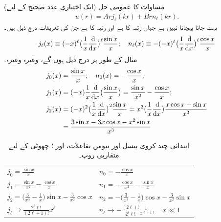 (ایک اختیاری عدد صحیح  کے لیے) مساوات  کا عمومی حل
\begin{align}\label{مساوات_تین_ابعادی_کروی_بیسل_اور_نیومن_حل}
u(r)=Arj_{\ell}(kr)+Brn_{\ell}(kr). 
\end{align}
 بہت جانا پہچانا نہیں ہے جہاں  رتبہ  کا  ہے اور  رتبہ  کا  ہے جن کی تعریفات درج ذیل ہیں۔ 
\begin{align}\label{مساوات_ابعادی_تعریفات_کروی_بیسل_نیومن}
j_{\ell}(x)\equiv(-x)^{\ell}\big(\frac{1}{x}\frac{\dif}{\dif x}\big)^{\ell}\frac{\sin x}{x};\quad n_{\ell}(x)\equiv-(-x)^{\ell}
\big(\frac{1}{x}\frac{\dif}{\dif x}\big)^{\ell}\frac{\cos x}{x}
\end{align}
مثال کے طور پر درج ذیل ہوں گے، وغیرہ وغیرہ۔
\begin{align*}
j_{0}(x)&=\frac{\sin x}{x};\quad n_{0}(x)=-\frac{\cos x}{x};\\
j_1(x)&=(-x)\frac{1}{x}\frac{\dif}{\dif x}\big(\frac{\sin x}{x}\big)=\frac{\sin x}{x^{2}}-\frac{\cos x}{x};\\
j_{2}(x)&=(-x)^{2}\big(\frac{1}{x}\frac{\dif}{\dif x}\big)^{2}\frac{\sin x}{x}=x^{2}\big(\frac{1}{x}\frac{\dif}{\dif x}\big)\frac{x\cos x-\sin x}{x^{3}}\\
&=\frac{3\sin x-3x\cos x-x^2\sin x}{x^{3}}
\end{align*}
\begin{table}
\caption{
ابتدائی چند کروی بیسل اور نیومن تفاعلات،  اور ؛ چھوٹی  کے لیے متقاربی روپ۔
}
\label{جدول_ابعادی_کروی_بیسل_نیومن_تفاعلات}
\centering
\renewcommand{\arraystretch}{2} 
\begin{tabular}{ll}
\toprule
$j_0=\frac{\sin x}{x}$ & $n_0=-\frac{\cos x}{x}$\\
$j_1=\frac{\sin x}{x^2}-\frac{\cos x}{x}$ & $n_1=-\frac{\cos x}{x^2}-\frac{\sin x}{x}$\\
$j_2=\big(\frac{3}{x^3}-\frac{1}{x}\big)\sin x-\frac{3}{x^2}\cos x$ & $n_2=-\big(\frac{3}{x^3}-\frac{1}{x}\big)\cos x-\frac{3}{x^2}\sin x$\\[0.5em]
\midrule
$j_{\ell}\to\frac{2^{\ell} \ell!}{(2\ell+1)!}x^{\ell}$ & $n_{\ell}\to -\frac{(2\ell)!}{2^{\ell}\ell!}\frac{1}{x^{\ell+1}},\quad x\ll 1$\\
\bottomrule
\end{tabular}
\end{table}
